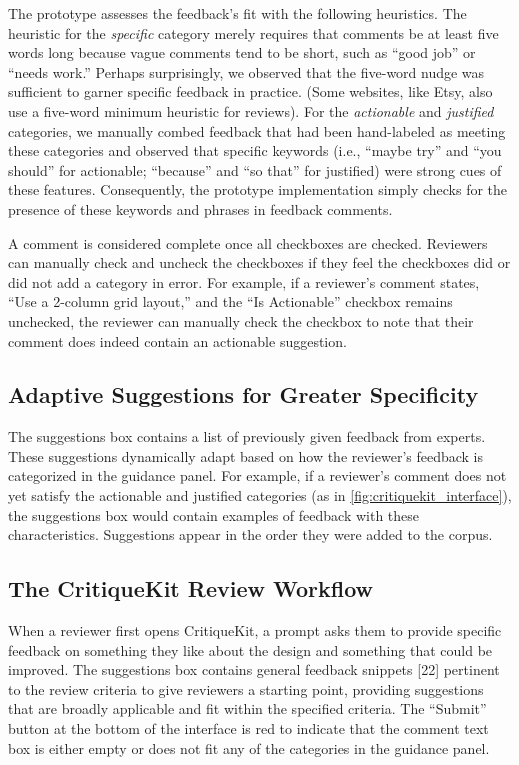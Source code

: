 The prototype assesses the feedback's fit with the following heuristics. The heuristic for the \textit{specific} category merely requires that comments be at least five words long because vague comments tend to be short, such as ``good job'' or ``needs work.'' Perhaps surprisingly, we observed that the five-word nudge was sufficient to garner specific feedback in practice. (Some websites, like Etsy, also use a five-word minimum heuristic for reviews). For the \textit{actionable} and \textit{justified} categories, we manually combed feedback that had been hand-labeled as meeting these categories and observed that specific keywords (i.e., ``maybe try'' and ``you should'' for actionable; ``because'' and ``so that'' for justified) were strong cues of these features. Consequently, the prototype implementation simply checks for the presence of these keywords and phrases in feedback comments. 

A comment is considered complete once all checkboxes are checked. Reviewers can manually check and uncheck the checkboxes if they feel the checkboxes did or did not add a category in error. For example, if a reviewer's comment states, ``Use a 2-column grid layout,'' and the ``Is Actionable'' checkbox remains unchecked, the reviewer can manually check the checkbox to note that their comment does indeed contain an actionable suggestion. 

\subsection{Adaptive Suggestions for Greater Specificity}
The suggestions box contains a list of previously given feedback from experts. These suggestions dynamically adapt based on how the reviewer's feedback is categorized in the guidance panel. For example, if a reviewer's comment does not yet satisfy the actionable and justified categories (as in \autoref{fig:critiquekit_interface}), the suggestions box would contain examples of feedback with these characteristics. Suggestions appear in the order they were added to the corpus.

\subsection{The CritiqueKit Review Workflow}
When a reviewer first opens CritiqueKit, a prompt asks them to provide specific feedback on something they like about the design and something that could be improved. The suggestions box contains general feedback snippets [22] pertinent to the review criteria to give reviewers a starting point, providing suggestions that are broadly applicable and fit within the specified criteria. The ``Submit'' button at the bottom of the interface is red to indicate that the comment text box is either empty or does not fit any of the categories in the guidance panel. 


